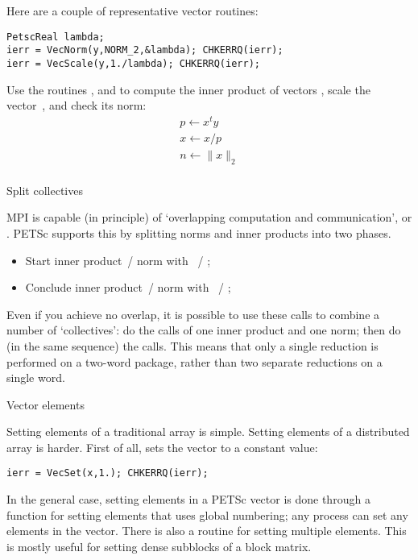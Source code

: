 Here are a couple of representative vector routines:
\begin{lstlisting}
PetscReal lambda;
ierr = VecNorm(y,NORM_2,&lambda); CHKERRQ(ierr);
ierr = VecScale(y,1./lambda); CHKERRQ(ierr);  
\end{lstlisting}

\begin{exercise}
Use the routines , 
and  to compute the inner product of vectors
, scale the vector~, and check its norm:
\[
\begin{array}{l}
p \leftarrow x^ty\\
x \leftarrow x/p\\
n \leftarrow \|x\|_2\\
\end{array}
\]
\end{exercise}

 {Split collectives}

MPI is capable (in principle) of `overlapping computation and communication',
or . PETSc supports this
by splitting norms and inner products into two phases.
\begin{itemize}
\item Start inner product~/ norm with ~/
  ;
\item Conclude inner product~/ norm with ~/
  ;
\end{itemize}
Even if you achieve no overlap, it is possible to use these calls to
combine a number of `collectives': do the  calls of one inner
product and one norm; then do (in the same sequence) the  calls.
This means that only a single reduction is performed on a two-word
package, rather than two separate reductions on a single word.

 {Vector elements}

Setting elements of a traditional array is simple. Setting elements of
a distributed array is harder.
First of all,  sets the vector to a constant value:
\begin{lstlisting}
ierr = VecSet(x,1.); CHKERRQ(ierr);  
\end{lstlisting}

In the general case, setting elements in a PETSc vector is done
through a
function  for setting elements that uses global numbering; any
process can set any elements in the vector.
%
There is also a routine  for setting
multiple elements. This is mostly useful for setting dense subblocks
of a block matrix.


